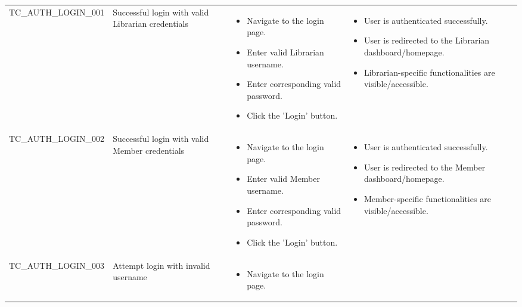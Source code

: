 \documentclass[10pt, a4paper]{report}
\begin{document}
\begin{longtable}{|>{\raggedright\arraybackslash}p{4cm}|>{\raggedright\arraybackslash}p{4cm}|>{\raggedright\arraybackslash}p{5cm}|>{\raggedright\arraybackslash}p{5cm}|}
\multicolumn{4}{|l|}{\textbf{Sub-Section: User Login}} \\ \hline
TC\_AUTH\_LOGIN\_001 & Successful login with valid Librarian credentials & 
    \begin{itemize}[noitemsep, topsep=0pt, partopsep=0pt, leftmargin=*]
        \item Navigate to the login page.
        \item Enter valid Librarian username.
        \item Enter corresponding valid password.
        \item Click the 'Login' button.
    \end{itemize} & 
    \begin{itemize}[noitemsep, topsep=0pt, partopsep=0pt, leftmargin=*]
        \item User is authenticated successfully.
        \item User is redirected to the Librarian dashboard/homepage.
        \item Librarian-specific functionalities are visible/accessible.
    \end{itemize} \\ \hline
TC\_AUTH\_LOGIN\_002 & Successful login with valid Member credentials & 
    \begin{itemize}[noitemsep, topsep=0pt, partopsep=0pt, leftmargin=*]
        \item Navigate to the login page.
        \item Enter valid Member username.
        \item Enter corresponding valid password.
        \item Click the 'Login' button.
    \end{itemize} & 
    \begin{itemize}[noitemsep, topsep=0pt, partopsep=0pt, leftmargin=*]
        \item User is authenticated successfully.
        \item User is redirected to the Member dashboard/homepage.
        \item Member-specific functionalities are visible/accessible.
    \end{itemize} \\ \hline
TC\_AUTH\_LOGIN\_003 & Attempt login with invalid username & 
    \begin{itemize}[noitemsep, topsep=0pt, partopsep=0pt, leftmargin=*]
        \item Navigate to the login page.

\end{itemize}
\end{longtable}
\end{document}
